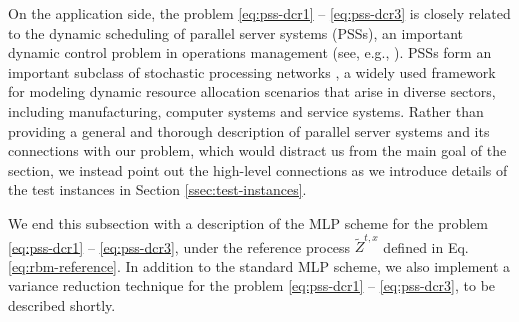 \documentclass[11pt]{article}
\theoremstyle{definition}
\theoremstyle{plain}
\begin{document}
On the application side, the problem \eqref{eq:pss-dcr1} -- \eqref{eq:pss-dcr3} 
is closely related to the dynamic scheduling of parallel server systems (PSSs), 
an important dynamic control problem in operations management (see, e.g., \cite{PesicWilliams2016,HarrisonLopez1999}). 
PSSs form an important subclass of stochastic processing networks \cite{Harrison2000,Harrison2006Corr}, 
a widely used framework for modeling dynamic resource allocation scenarios that arise in diverse sectors, 
including manufacturing, computer systems and service systems. 
Rather than providing a general and thorough description of parallel server systems and its connections with our problem, 
which would distract us from the main goal of the section, 
we instead point out the high-level connections as we introduce details of the test instances in Section \ref{ssec:test-instances}.

We end this subsection with a description of the MLP scheme for the problem \eqref{eq:pss-dcr1} -- \eqref{eq:pss-dcr3}, 
under the reference process $\tilde Z^{t,x}$ defined in Eq. \eqref{eq:rbm-reference}. 
In addition to the standard MLP scheme, we also implement a variance reduction technique 
for the problem \eqref{eq:pss-dcr1} -- \eqref{eq:pss-dcr3}, to be described shortly. 
\end{document}
